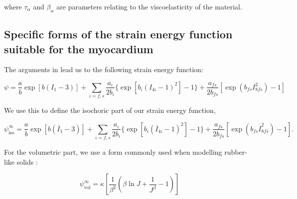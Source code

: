 \noindent where $\tau_{\alpha}$ and $\beta_{\alpha}$ are parameters
relating to the viscoelasticity of the material.

\subsection{Specific forms of the strain energy function suitable for the myocardium}
\label{specific-forms}

The arguments in \citep{Holzapfel:2009bb} lead us to the following
strain energy function:

\begin{equation}
  \psi = \frac{a}{b}\exp[b(I_{1} - 3)]
       + \sum_{\iota=f, s} \frac{a_{\iota}}{2 b_{\iota}}\{\exp\left[b_{\iota}\left(I_{4\iota} - 1\right)^{2}\right] - 1\}
       + \frac{a_{fs}}{2 b_{fs}} \left[\exp\left(b_{fs}I_{8fs}^{2}\right) - 1\right]
\end{equation}

\noindent We use this to define the isochoric part of our strain
energy function,

\begin{equation}
  \psi_{\mathrm{iso}}^{\infty} = \frac{a}{b}\exp[b(\overline{I}_{1} - 3)]
       + \sum_{\iota=f, s} \frac{a_{\iota}}{2 b_{\iota}}\{\exp\left[b_{\iota}\left(\overline{I}_{4\iota} - 1\right)^{2}\right] - 1\}
       + \frac{a_{fs}}{2 b_{fs}} \left[\exp\left(b_{fs}\overline{I}_{8fs}^{2}\right) - 1\right].
\end{equation}

\noindent For the volumetric part, we use a form commonly used when
modelling rubber-like solids \citep{Holzapfel:1996}:

\begin{equation}
  \psi_{\mathrm{vol}}^{\infty} = \kappa \left[\frac{1}{\beta^{2}}\left(\beta\ln J + \frac{1}{J^{\beta}} - 1\right)\right]
\end{equation}



%

